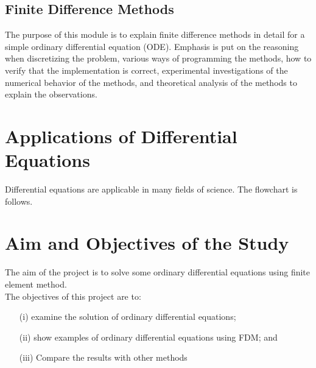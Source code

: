 \documentclass[12pt]{report}
\newcommand{\sps}{\\[0.2cm]}
\begin{document}
	
	\subsection{Finite Difference Methods}
	The purpose of this module is to explain finite difference methods in detail for a simple ordinary differential equation (ODE). Emphasis is put on the reasoning when discretizing the problem, various ways of programming the methods, how to verify that the implementation is correct, experimental investigations of the numerical behavior of the methods, and theoretical analysis of the methods to explain the observations.
	
	\section{Applications of Differential Equations}
	Differential equations are applicable in many fields of science. The flowchart is follows.
	\begin{center}
	\end{center}
	
	
	\section{Aim and Objectives of the Study}
	The aim of the project is to solve some ordinary differential equations using finite element method.\sps
	The objectives of this project are to:
	
	\begin{enumerate}
		\item[(i)] examine the solution of ordinary differential equations;
		
		\item[(ii)] show examples of ordinary differential equations using FDM; and
		\item[(iii)] Compare the results with other methods
	\end{enumerate}
	
\end{document}
